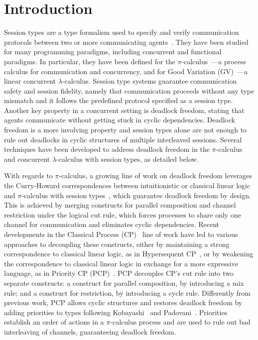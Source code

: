 \documentclass[main.tex]{subfiles}
\begin{document}
\section{Introduction}
Session types are a type formalism used to specify and verify communication protocols between two or more communicating agents~\cite{honda93,takeuchihonda94,hondavasconcelos98,carbonehonda07}.
They have been studied for many programming paradigms, including concurrent and functional paradigms. In particular, they have been defined for the $\pi$-calculus~\cite{sangiorgiwalker01}---a process calculus for communication and concurrency, and for Good Variation (GV)~\cite{wadler14,lindleymorris15}---a linear concurrent $\lambda$-calculus.
Session type systems guarantee communication safety and session fidelity, namely that communication proceeds without any type mismatch and it follows the predefined protocol specified as a session type.
Another key property in a concurrent setting is deadlock freedom, stating that agents communicate without getting stuck in cyclic dependencies. Deadlock freedom is a more involving property and session types alone are not enough to rule out deadlocks in cyclic structures of multiple interleaved sessions. Several techniques have been developed to address deadlock freedom in the $\pi$-calculus and concurrent $\lambda$-calculus with session types, as detailed below.

With regards to $\pi$-calculus, a growing line of work on deadlock freedom leverages the Curry-Howard correspondences between intuitionistic or classical linear logic and $\pi$-calculus with session types~\cite{cairespfenning10,wadler14}, which guarantee deadlock freedom by design. This is achieved by merging constructs for parallel composition and channel restriction under the logical cut rule, which forces processes to share only one channel for communication and eliminates cyclic dependencies. Recent developments in the Classical Process (CP)~\cite{wadler14} line of work have led to various approaches to decoupling these constructs, either by maintaining a strong correspondence to classical linear logic, as in Hypersequent CP~\cite{kokkemontesi19popl,kokkemontesi19tlla}, or by weakening the correspondence to classical linear logic in exchange for a more expressive language, as in Priority CP (PCP)~\cite{dardhagay18}. PCP decouples CP's cut rule into two separate constructs: a construct for parallel composition, by introducing a mix rule; and a construct for restriction, by introducing a cycle rule. Differently from previous work, PCP allows cyclic structures and restores deadlock freedom by adding priorities to types following Kobayashi~\cite{kobayashi06} and Padovani~\cite{padovani14}. Priorities establish an order of actions in a $\pi$-calculus process and are used to rule out bad interleaving of channels, guaranteeing deadlock freedom.
\end{document}
